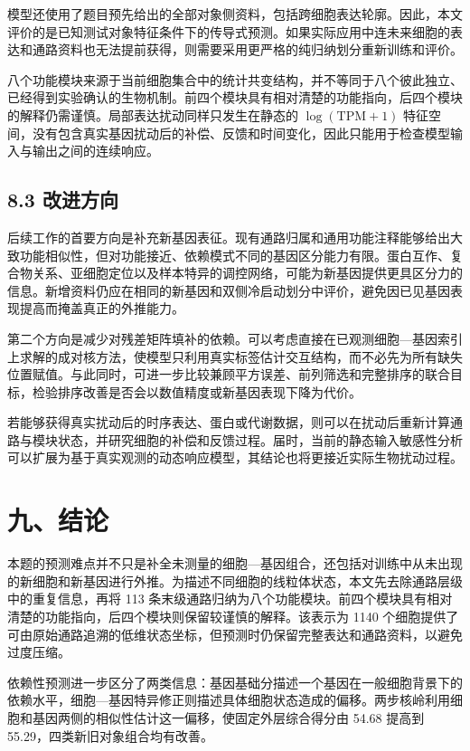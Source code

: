 模型还使用了题目预先给出的全部对象侧资料，包括跨细胞表达轮廓。因此，本文评价的是已知测试对象特征条件下的传导式预测。如果实际应用中连未来细胞的表达和通路资料也无法提前获得，则需要采用更严格的纯归纳划分重新训练和评价。

八个功能模块来源于当前细胞集合中的统计共变结构，并不等同于八个彼此独立、已经得到实验确认的生物机制。前四个模块具有相对清楚的功能指向，后四个模块的解释仍需谨慎。局部表达扰动同样只发生在静态的 \(\log(\mathrm{TPM}+1)\) 特征空间，没有包含真实基因扰动后的补偿、反馈和时间变化，因此只能用于检查模型输入与输出之间的连续响应。

\hypertarget{83-ux6539ux8fdbux65b9ux5411}{%
\subsection{8.3 改进方向}\label{83-ux6539ux8fdbux65b9ux5411}}

后续工作的首要方向是补充新基因表征。现有通路归属和通用功能注释能够给出大致功能相似性，但对功能接近、依赖模式不同的基因区分能力有限。蛋白互作、复合物关系、亚细胞定位以及样本特异的调控网络，可能为新基因提供更具区分力的信息。新增资料仍应在相同的新基因和双侧冷启动划分中评价，避免因已见基因表现提高而掩盖真正的外推能力。

第二个方向是减少对残差矩阵填补的依赖。可以考虑直接在已观测细胞---基因索引上求解的成对核方法，使模型只利用真实标签估计交互结构，而不必先为所有缺失位置赋值。与此同时，可进一步比较兼顾平方误差、前列筛选和完整排序的联合目标，检验排序改善是否会以数值精度或新基因表现下降为代价。

若能够获得真实扰动后的时序表达、蛋白或代谢数据，则可以在扰动后重新计算通路与模块状态，并研究细胞的补偿和反馈过程。届时，当前的静态输入敏感性分析可以扩展为基于真实观测的动态响应模型，其结论也将更接近实际生物扰动过程。

\hypertarget{ux4e5dux7ed3ux8bba}{%
\section{九、结论}\label{ux4e5dux7ed3ux8bba}}

本题的预测难点并不只是补全未测量的细胞---基因组合，还包括对训练中从未出现的新细胞和新基因进行外推。为描述不同细胞的线粒体状态，本文先去除通路层级中的重复信息，再将 113 条末级通路归纳为八个功能模块。前四个模块具有相对清楚的功能指向，后四个模块则保留较谨慎的解释。该表示为 1140 个细胞提供了可由原始通路追溯的低维状态坐标，但预测时仍保留完整表达和通路资料，以避免过度压缩。

依赖性预测进一步区分了两类信息：基因基础分描述一个基因在一般细胞背景下的依赖水平，细胞---基因特异修正则描述具体细胞状态造成的偏移。两步核岭利用细胞和基因两侧的相似性估计这一偏移，使固定外层综合得分由 54.68 提高到 55.29，四类新旧对象组合均有改善。

